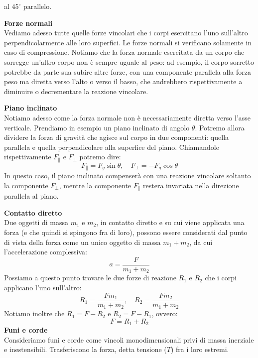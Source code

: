 \documentclass[a4paper,12pt]{article}
\begin{document}
al $45^\circ$ parallelo.
\par\smallskip
\textbf{Forze normali} \\
Vediamo adesso tutte quelle forze vincolari che i corpi esercitano l'uno sull'altro perpendicolarmente alle loro superfici.
Le forze normali si verificano solamente in caso di compressione. Notiamo che la forza normale esercitata da un corpo
che sorregge un'altro corpo non è sempre uguale al peso: ad esempio, il corpo sorretto potrebbe da parte sua subire altre
forze, con una componente parallela alla forza peso ma diretta verso l'alto o verso il basso, che andrebbero rispettivamente
a diminuire o decrementare la reazione vincolare.
\par\smallskip
\textbf{Piano inclinato} \\
Notiamo adesso come la forza normale non è necessariamente diretta verso l'asse verticale. Prendiamo in esempio un piano inclinato
di angolo $\theta$. Potremo allora dividere la forza di gravità che agisce sul corpo in due componenti: quella 
parallela e quella perpendicolare alla superfice del piano. Chiamandole rispettivamente $F_\parallel$ e $F_\perp$ potremo dire:
$$ F_\parallel = F_g \sin{\theta}, \quad F_\perp = -F_g \cos{\theta} $$
In questo caso, il piano inclinato compenserà con una reazione vincolare soltanto la componente $F_\perp$, mentre la componente
$F_\parallel$ restera invariata nella direzione parallela al piano.
\par\smallskip
\textbf{Contatto diretto} \\
Due oggetti di massa $m_1$ e $m_2$, in contatto diretto e su cui viene applicata una forza (e che quindi si spingono fra di loro),
possono essere considerati dal punto di vista della forza come un unico oggetto di massa $m_1 + m_2$, da cui l'accelerazione complessiva:
$$ a = \frac{F}{m_1 + m_2} $$
Possiamo a questo punto trovare le due forze di reazione $R_1$ e $R_2$ che i corpi applicano l'uno sull'altro:
$$ R_1 = \frac{Fm_1}{m_1 + m_2}, \quad R_2 = \frac{Fm_2}{m_1 + m_2} $$
Notiamo inoltre che $R_1 = F - R_2$ e $R_2 = F - R_1$, ovvero:
$$ F = R_1 + R_2 $$
\textbf{Funi e corde} \\
Consideriamo funi e corde come vincoli monodimensionali privi di massa inerziale e inestensibili. Trasferiscono la forza,
detta tensione ($T$) fra i loro estremi. 
\end{document}

